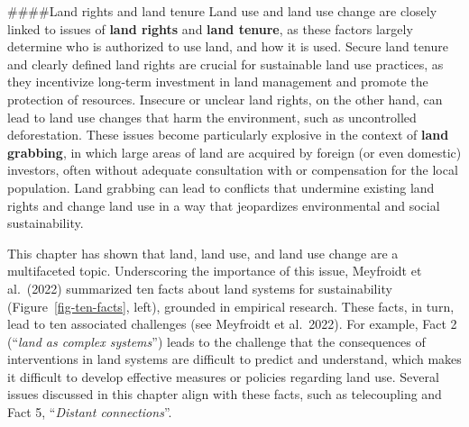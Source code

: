 \documentclass[
  a4paper,
  openany]{book}
\begin{document}
\begin{tcolorbox}[enhanced jigsaw, coltitle=black, bottomtitle=1mm, opacitybacktitle=0.6, titlerule=0mm, opacityback=0, leftrule=.75mm, colbacktitle=quarto-callout-note-color!10!white, bottomrule=.15mm, toptitle=1mm, breakable, title={Note}, arc=.35mm, rightrule=.15mm, toprule=.15mm, left=2mm, colback=white, colframe=quarto-callout-note-color-frame]

\#\#\#\#Land rights and land tenure Land use and land use change are
closely linked to issues of \textbf{land rights} and \textbf{land
tenure}, as these factors largely determine who is authorized to use
land, and how it is used. Secure land tenure and clearly defined land
rights are crucial for sustainable land use practices, as they
incentivize long-term investment in land management and promote the
protection of resources. Insecure or unclear land rights, on the other
hand, can lead to land use changes that harm the environment, such as
uncontrolled deforestation. These issues become particularly explosive
in the context of \textbf{land grabbing}, in which large areas of land
are acquired by foreign (or even domestic) investors, often without
adequate consultation with or compensation for the local population.
Land grabbing can lead to conflicts that undermine existing land rights
and change land use in a way that jeopardizes environmental and social
sustainability.

\end{tcolorbox}

This chapter has shown that land, land use, and land use change are a
multifaceted topic. Underscoring the importance of this issue, Meyfroidt
et al.~(2022) summarized ten facts about land systems for sustainability
(Figure~\ref{fig-ten-facts}, left), grounded in empirical research.
These facts, in turn, lead to ten associated challenges (see Meyfroidt
et al.~2022). For example, Fact 2 (``\emph{land as complex systems}'')
leads to the challenge that the consequences of interventions in land
systems are difficult to predict and understand, which makes it
difficult to develop effective measures or policies regarding land use.
Several issues discussed in this chapter align with these facts, such as
telecoupling and Fact 5, ``\emph{Distant connections}''.
\end{document}
